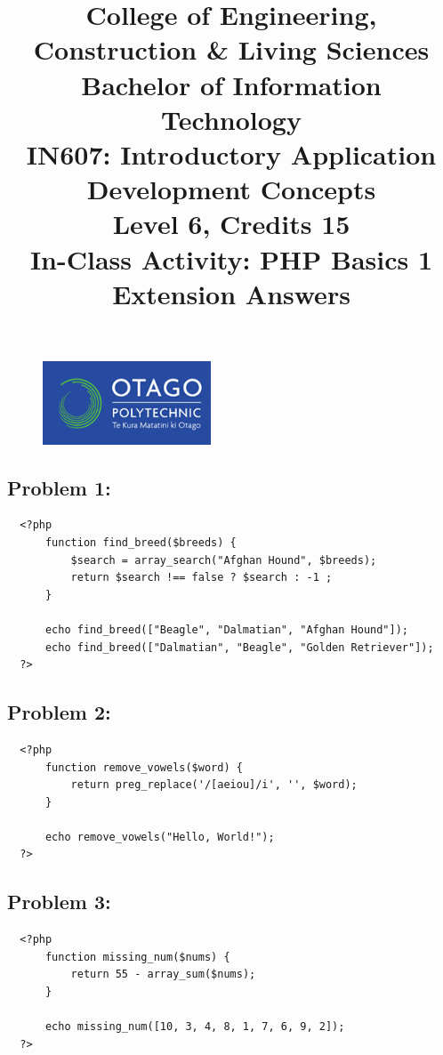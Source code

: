 \documentclass{article}
\author{}
\begin{document}
\begin{figure}
    \centering
    \includegraphics[width=50mm]{../img/logo.png}
\end{figure}

\title{College of Engineering, Construction \& Living Sciences\\Bachelor of Information Technology\\IN607: Introductory Application Development Concepts\\Level 6, Credits 15\\\textbf{In-Class Activity: PHP Basics 1 Extension Answers}}
\date{}
\maketitle
 
\subsection*{Problem 1:} 
\begin{verbatim}
  <?php
      function find_breed($breeds) {
          $search = array_search("Afghan Hound", $breeds);
          return $search !== false ? $search : -1 ;	
      }

      echo find_breed(["Beagle", "Dalmatian", "Afghan Hound"]);
      echo find_breed(["Dalmatian", "Beagle", "Golden Retriever"]);
  ?>
\end{verbatim}

\subsection*{Problem 2:} 
\begin{verbatim}
  <?php
      function remove_vowels($word) {
          return preg_replace('/[aeiou]/i', '', $word);
      }

      echo remove_vowels("Hello, World!");
  ?>
\end{verbatim}

\subsection*{Problem 3:} 
\begin{verbatim}
  <?php
      function missing_num($nums) {
          return 55 - array_sum($nums);
      }

      echo missing_num([10, 3, 4, 8, 1, 7, 6, 9, 2]);
  ?>
\end{verbatim}
\end{document}
